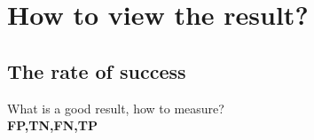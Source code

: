 \section{How to view the result?}
  \subsection{The rate of success}
  What is a good result, how to measure?\\
  \textbf{FP,TN,FN,TP}\\
